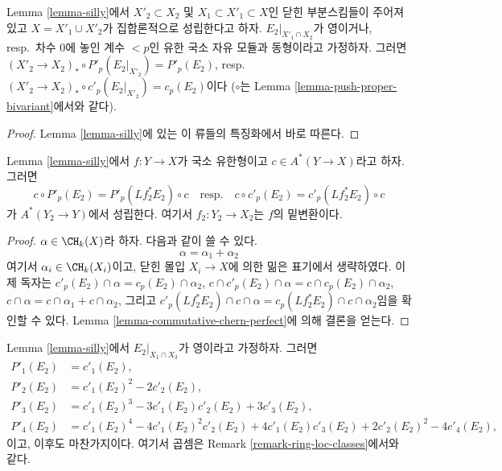 \begin{lemma}
\label{lemma-silly-shrink}
Lemma \ref{lemma-silly}에서 $X'_2 \subset X_2$ 및
$X_1 \subset X'_1 \subset X$인 닫힌 부분스킴들이 주어져 있고
$X = X'_1 \cup X'_2$가 집합론적으로 성립한다고 하자.
$E_2|_{X'_1 \cap X_2}$가 영이거나, resp.\ 차수 $0$에 놓인 계수 $< p$인
유한 국소 자유 모듈과 동형이라고 가정하자. 그러면
$(X'_2 \to X_2)_* \circ P'_p(E_2|_{X'_2}) = P'_p(E_2)$,
resp.\  $(X'_2 \to X_2)_* \circ c'_p(E_2|_{X'_2}) = c_p(E_2)$이다
($\circ$는 Lemma \ref{lemma-push-proper-bivariant}에서와 같다).
\end{lemma}

\begin{proof}
Lemma \ref{lemma-silly}에 있는 이 류들의 특징화에서 바로 따른다.
\end{proof}

\begin{lemma}
\label{lemma-silly-commutes}
Lemma \ref{lemma-silly}에서 $f : Y \to X$가 국소 유한형이고
$c \in A^*(Y \to X)$라고 하자. 그러면
$$
c \circ P'_p(E_2) = P'_p(Lf_2^*E_2) \circ c
\quad\text{resp.}\quad
c \circ c'_p(E_2) = c'_p(Lf_2^*E_2) \circ c
$$
가 $A^*(Y_2 \to Y)$에서 성립한다. 여기서 $f_2 : Y_2 \to X_2$는
$f$의 밑변환이다.
\end{lemma}

\begin{proof}
$\alpha \in \CH_k(X)$라 하자. 다음과 같이 쓸 수 있다.
$$
\alpha = \alpha_1 + \alpha_2
$$
여기서 $\alpha_i \in \CH_k(X_i)$이고, 닫힌 몰입 $X_i \to X$에 의한
밂은 표기에서 생략하였다. 이제 독자는
$c'_p(E_2) \cap \alpha = c_p(E_2) \cap \alpha_2$,
$c \cap c'_p(E_2) \cap \alpha = c \cap c_p(E_2) \cap \alpha_2$,
$c \cap \alpha = c \cap \alpha_1 + c \cap \alpha_2$, 그리고
$c'_p(Lf_2^*E_2) \cap c \cap \alpha = c_p(Lf_2^*E_2) \cap c \cap \alpha_2$임을
확인할 수 있다. Lemma \ref{lemma-commutative-chern-perfect}에 의해 결론을
얻는다.
\end{proof}

\begin{lemma}
\label{lemma-silly-compose}
Lemma \ref{lemma-silly}에서 $E_2|_{X_1 \cap X_2}$가 영이라고 가정하자.
그러면
\begin{align*}
P'_1(E_2) & = c'_1(E_2), \\
P'_2(E_2) & = c'_1(E_2)^2 - 2c'_2(E_2), \\
P'_3(E_2) & = c'_1(E_2)^3 - 3c'_1(E_2)c'_2(E_2) + 3c'_3(E_2), \\
P'_4(E_2) & = c'_1(E_2)^4 - 4c'_1(E_2)^2c'_2(E_2) +
4c'_1(E_2)c'_3(E_2) + 2c'_2(E_2)^2 - 4c'_4(E_2),
\end{align*}
이고, 이후도 마찬가지이다. 여기서 곱셈은 Remark
\ref{remark-ring-loc-classes}에서와 같다.
\end{lemma}

